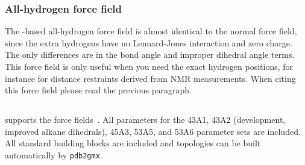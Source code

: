 \subsubsection{All-hydrogen force field}
The -based all-hydrogen force field is almost identical to the
normal  force field, since the extra hydrogens have no
Lennard-Jones interaction and zero charge. The only differences are in
the bond angle and improper dihedral angle terms. This force field is
only useful when you need the exact hydrogen positions, for instance
for distance restraints derived from NMR measurements. When citing
this force field please read the previous paragraph.

\subsection{}
{\gromacs} supports the  force fields~\cite{gromos96}.
All parameters for the 43A1, 43A2 (development, improved alkane
dihedrals), 45A3, 53A5, and 53A6 parameter sets are included.  All standard
building blocks are included and topologies can be built automatically
by {\tt pdb2gmx}.  

